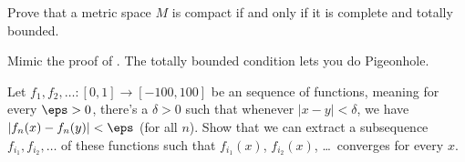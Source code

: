 \begin{dproblem}
	\gim
	Prove that a metric space $M$ is compact if and only if it is complete and totally bounded.
	\label{thm:heine_borel}
	\begin{hint}
		Mimic the proof of .
		The totally bounded condition lets you do Pigeonhole.
	\end{hint}
\end{dproblem}

\begin{problem}
	\gim
	Let 
	$f_1, f_2, \dots : [0,1] \to [-100,100]$
	be an  sequence of functions,
	meaning for every $\eps > 0$, there's a $\delta > 0$ such that
	whenever $\left\lvert x-y \right\rvert < \delta$,
	we have $\left\lvert f_n(x)-f_n(y) \right\rvert < \eps$ (for all $n$).
	Show that we can extract a subsequence $f_{i_1}, f_{i_2}, \dots$ of these functions such that
	$f_{i_1}(x)$, $f_{i_2}(x)$, \dots\ converges for every $x$.
\end{problem}
